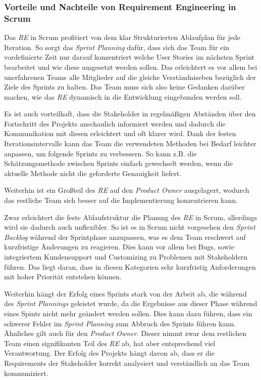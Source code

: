 \documentclass[acmtog]{acmart}
\begin{document}
\subsubsection{Vorteile und Nachteile von Requirement Engineering in Scrum}

Das \emph{RE} in Scrum profitiert von dem klar Strukturierten Ablaufplan für jede Iteration. So sorgt das \emph{Sprint Planning} dafür, dass sich das 
Team für ein vordefinierte Zeit nur darauf konzentriert welche User Stories im nächsten Sprint bearbeitet und wie diese umgesetzt werden sollen. Das erleichtert es vor 
allem bei unerfahrenen Teams alle Mitglieder auf die gleiche Verständniseben bezüglich der Ziele des Sprints zu halten. Das Team muss sich 
also keine Gedanken darüber machen, wie das \emph{RE} dynamisch in die Entwicklung eingebunden werden soll.

Es ist auch vorteilhaft, dass die Stakeholder in regelmäßigen Abständen über den Fortschritt des Projekts anschaulich informiert werden und 
dadurch die Kommunikation mit diesen erleichtert und oft klarer wird. Dank der festen Iterationsintervalle kann das Team die verwendeten 
Methoden bei Bedarf leichter anpassen, um folgende Sprints zu verbessern. So kann z.B. die Schätzungsmethode zwischen Sprints einfach gewechselt 
werden, wenn die aktuelle Methode nicht die geforderte Genauigkeit liefert.

Weiterhin ist ein Großteil des \emph{RE} auf den \emph{Product Owner} ausgelagert, wodurch das restliche Team sich besser auf die Implementierung konzentrieren kann.

Zwar erleichtert die feste Ablaufstruktur die Planung des \emph{RE} in Scrum, allerdings wird sie dadurch auch unflexibler. So ist es in Scrum nicht 
vorgesehen den \emph{Sprint Backlog} während der Sprintphase anzupassen, was es dem Team erschwert auf kurzfristige Änderungen zu reagieren. Dies 
kann vor allem bei Bugs, sowie integriertem Kundensupport und Customizing zu Problemen mit Stakeholdern führen. Das liegt daran, dass in 
diesen Kategorien sehr kurzfristig Anforderungen mit hoher Priorität entstehen können.

Weiterhin hängt der Erfolg eines Sprints stark von der Arbeit ab, die während des \emph{Sprint Plannings} geleistet wurde, da die Ergebnisse aus 
dieser Phase während eines Spints nicht mehr geändert werden sollen. Dies kann dazu führen, dass ein schwerer Fehler im \emph{Sprint Planning} zum 
Abbruch des Sprints führen kann. Ähnliches gilt auch für den \emph{Product Owner}. Dieser nimmt zwar dem restlichen Team einen signifikanten Teil 
des \emph{RE} ab, hat aber entsprechend viel Verantwortung. Der Erfolg des Projekts hängt davon ab, dass er die Requirements der Stakeholder korrekt 
analysiert und verständlich an das Team kommuniziert.
\end{document}
